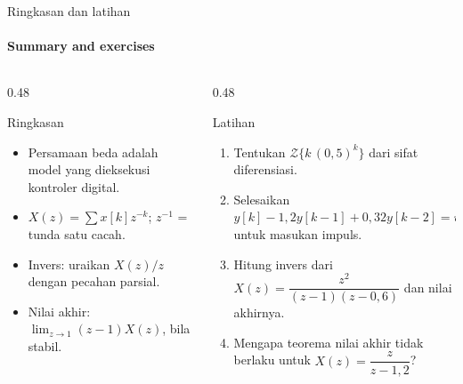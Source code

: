 \documentclass[aspectratio=169,10pt]{beamer}
\begin{document}
\begin{frame}{Ringkasan dan latihan}
	\framesubtitle{Summary and exercises}
	\begin{columns}[T]
		\begin{column}{0.48\textwidth}
			\begin{block}{Ringkasan}
				\small
				\begin{itemize}
					\item Persamaan beda adalah model yang dieksekusi kontroler digital.
					\item $X(z)=\sum x[k]z^{-k}$; $z^{-1}$ = tunda satu cacah.
					\item Invers: uraikan $X(z)/z$ dengan pecahan parsial.
					\item Nilai akhir: $\lim_{z\to1}(z-1)X(z)$, bila stabil.
				\end{itemize}
			\end{block}
		\end{column}
		\begin{column}{0.48\textwidth}
			\begin{exampleblock}{Latihan}
				\small
				\begin{enumerate}
					\item Tentukan $\mathcal{Z}\{k\,(0{,}5)^k\}$ dari sifat diferensiasi.
					\item Selesaikan $y[k] - 1{,}2y[k-1] + 0{,}32y[k-2] = u[k-1]$ untuk masukan impuls.
					\item Hitung invers dari $X(z) = \dfrac{z^2}{(z-1)(z-0{,}6)}$ dan nilai akhirnya.
					\item Mengapa teorema nilai akhir tidak berlaku untuk $X(z)=\dfrac{z}{z-1{,}2}$?
				\end{enumerate}
			\end{exampleblock}
		\end{column}
	\end{columns}
\end{frame}
\end{document}
